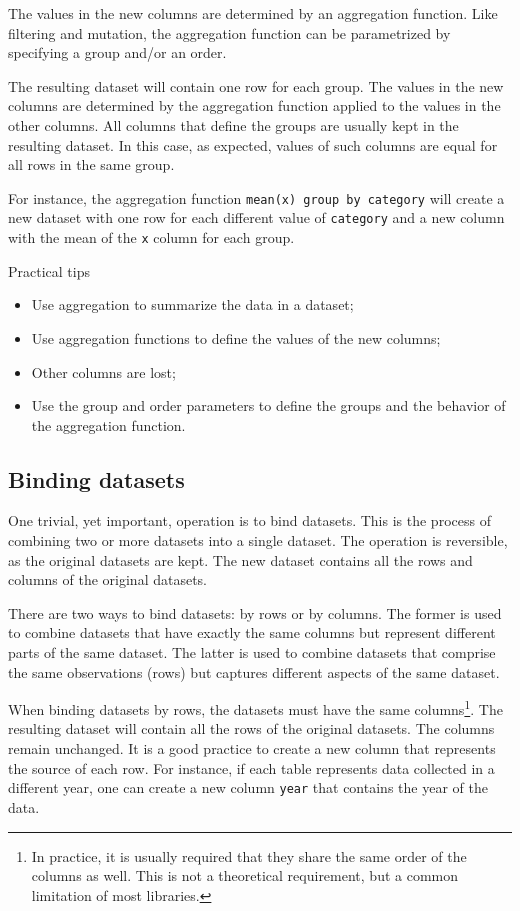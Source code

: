 The values in the new columns are determined by an aggregation function.  Like filtering
and mutation, the aggregation function can be parametrized by specifying a group and/or an
order.

The resulting dataset will contain one row for each group.  The values in the new columns
are determined by the aggregation function applied to the values in the other columns.
All columns that define the groups are usually kept in the resulting dataset.  In this
case, as expected, values of such columns are equal for all rows in the same group.

For instance, the aggregation function \texttt{mean(x) group by category} will create a
new dataset with one row for each different value of \texttt{category} and a new column
with the mean of the \texttt{x} column for each group.

\begin{mainbox}{Practical tips}
  \begin{itemize}
    \item Use aggregation to summarize the data in a dataset;
    \item Use aggregation functions to define the values of the new columns;
    \item Other columns are lost;
    \item Use the group and order parameters to define the groups and the behavior of the
      aggregation function.
  \end{itemize}
\end{mainbox}

\subsection{Binding datasets}

One trivial, yet important, operation is to bind datasets.  This is the process of
combining two or more datasets into a single dataset.  The operation is reversible, as the
original datasets are kept.  The new dataset contains all the rows and columns of the
original datasets.

There are two ways to bind datasets: by rows or by columns.  The former is used to
combine datasets that have exactly the same columns but represent different parts of the
same dataset.  The latter is used to combine datasets that comprise the same observations
(rows) but captures different aspects of the same dataset.

When binding datasets by rows, the datasets must have the same columns\footnote{In
practice, it is usually required that they share the same order of the columns as well.
This is not a theoretical requirement, but a common limitation of most libraries.}.
The resulting dataset will contain all the rows of the original datasets.  The columns
remain unchanged.  It is a good practice to create a new column that represents the source
of each row.  For instance, if each table represents data collected in a different year,
one can create a new column \texttt{year} that contains the year of the data.

